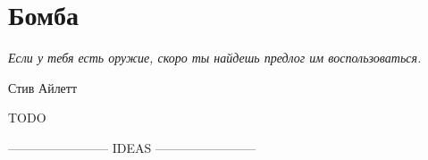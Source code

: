 \chapter{Бомба}\label{ch:the_bomb}

\epigraph{\emph{Если у тебя есть оружие, \break скоро ты найдешь предлог им воспользоваться.}}{Стив Айлетт}

TODO

------------------------ IDEAS ------------------------ 

